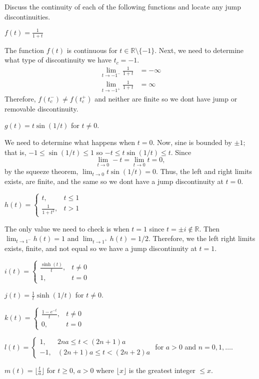Discuss the continuity of each of the following functions and locate any jump
discontinuities.
\begin{exercise}
\item
  \(f(t) = \frac{1}{1 + t}\)
  \par\smallskip
  The function \(f(t)\) is continuous for \(t\in\mathbb{R}\setminus\{-1\}\).
  Next, we need to determine what type of discontinuity we have \(t_c = -1\).
  \begin{align*}
    \lim_{t\to -1^-}\frac{1}{1 + t} & = -\infty\\
    \lim_{t\to -1^+}\frac{1}{1 + t} & = \infty
  \end{align*}
  Therefore, \(f(t_c^-)\neq f(t_c^+)\) and neither are finite so we dont have
  jump or removable discontinuity.
\item
  \(g(t) = t\sin(1/t)\) for \(t\neq 0\).
  \par\smallskip
  We need to determine what happens when \(t = 0\).
  Now, sine is bounded by \(\pm 1\); that is, \(-1\leq\sin(1/t)\leq 1\) so
  \(-t\leq t\sin(1/t)\leq t\).
  Since
  \[
  \lim_{t\to 0}-t = \lim_{t\to 0}t = 0,
  \]
  by the squeeze theorem, \(\lim_{t\to 0}t\sin(1/t) = 0\).
  Thus, the left and right limits exists, are finite, and the same so we
  dont have a jump discontinuity at \(t = 0\).
\item
  \(h(t) =
  \begin{cases}
    t, & t\leq 1\\
    \frac{1}{1 + t^2}, & t > 1
  \end{cases}\)
  \par\smallskip
  The only value we need to check is when \(t = 1\) since
  \(t = \pm i\not\in\mathbb{R}\).
  Then \(\lim_{t\to 1^-}h(t) = 1\) and \(\lim_{t\to 1^+}h(t) = 1/2\).
  Therefore, we the left right limits exists, finite, and not equal so we have
  a jump discontinuity at \(t = 1\).
\item
  \(i(t) =
  \begin{cases}
    \frac{\sinh(t)}{t}, & t\neq 0\\
    1, & t = 0
  \end{cases}\)
\item
  \(j(t) = \frac{1}{t}\sinh(1/t)\) for \(t\neq 0\).
\item
  \(k(t) =
  \begin{cases}
    \frac{1 - e^{-t}}{t}, & t\neq 0\\
    0, & t = 0
  \end{cases}\)
\item
  \(l(t) =
  \begin{cases}
    1, & 2na\leq t < (2n + 1)a\\
    -1, & (2n + 1)a\leq t < (2n + 2)a
  \end{cases}\)
  for \(a > 0\) and \(n = 0,1,\ldots\).
\item
  \(m(t) = \bigl\lfloor\frac{t}{a}\bigr\rfloor\) for \(t\geq 0\), \(a > 0\)
  where \(\lfloor x\rfloor\) is the greatest integer \(\leq x\). 
\end{exercise}
